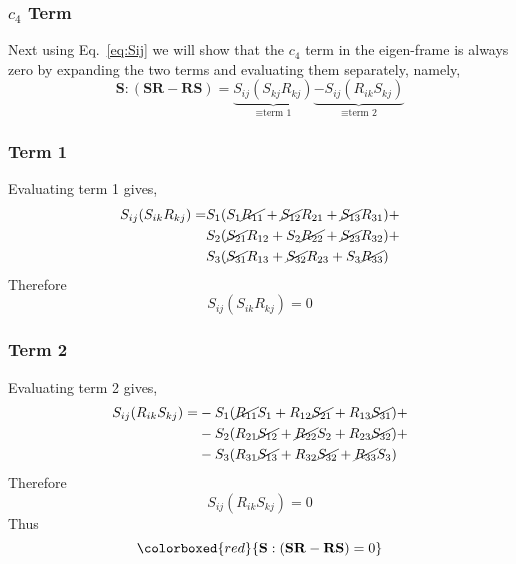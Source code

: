 \subsubsection{$c_{4}$ Term}
Next using Eq.~\ref{eq:Sij} we will show that the $c_{4}$ term in the eigen-frame is always zero
by expanding the two terms and evaluating them separately, namely,
\begin{equation}
    \mathbf{S}:( \mathbf{SR} - \mathbf{RS}) = 
        \underbrace{S_{ij}(S_{kj}R_{kj})}_{\equiv \text{term 1}} 
        \underbrace{ - S_{ij}(R_{ik}S_{kj})}_{\equiv \text{term 2}}
\end{equation}
\subsubsection{Term 1}
Evaluating term 1 gives,
\begin{equation}
    \begin{split}
        S_{ij}(S_{ik}R_{kj}) = &
                S_{1}(S_{1} \cancel{R_{11}} + \cancel{S_{12}} R_{21} + \cancel{S_{13}} R_{31}) + \\
            &   S_{2}(\cancel{S_{21}} R_{12} + S_{2} \cancel{R_{22}} + \cancel{S_{23}} R_{32}) + \\
            &   S_{3}(\cancel{S_{31}} R_{13} + \cancel{S_{32}} R_{23} + S_{3} \cancel{R_{33}})
    \end{split}
\end{equation}
Therefore
\begin{equation}
    S_{ij}(S_{ik}R_{kj}) = 0 
\end{equation}
\subsubsection{Term 2}
Evaluating term 2 gives,
\begin{equation}
    \begin{split}
        S_{ij}(R_{ik}S_{kj}) = &
               -S_{1}(\cancel{R_{11}} S_{1} + R_{12} \cancel{S_{21}} + R_{13} \cancel{S_{31}})+   \\
            &  -S_{2}(R_{21} \cancel{S_{12}} + \cancel{R_{22}} S_{2} + R_{23} \cancel{S_{32}})+   \\
            &  -S_{3}(R_{31} \cancel{S_{13}} + R_{32} \cancel{S_{32}} + \cancel{R_{33}} S_{3})
    \end{split}
\end{equation}
Therefore
\begin{equation}
    S_{ij}(R_{ik}S_{kj}) = 0
\end{equation}
Thus
\begin{equation}
    \colorboxed{red}{
        \mathbf{S}:(\mathbf{SR} - \mathbf{RS}) =0 
    }
\end{equation}
